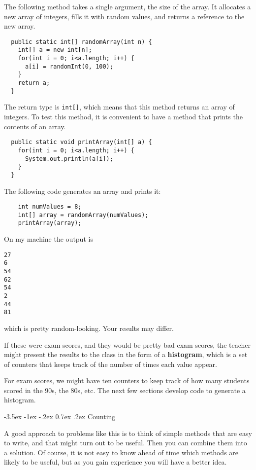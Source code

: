 \documentclass{book}
\makeatletter
\renewcommand{\section}{\@startsection 
    {section} {1} {0mm}%
    {-3.5ex \@plus -1ex \@minus -.2ex}%
    {0.7ex \@plus.2ex}%
    {\normalfont\Large\bfseries}}
\makeatother
\begin{document}
The following method takes a single argument, the size of
the array.  It allocates a new array of integers, fills
it with random values, and returns a reference to the new
array.

\begin{verbatim}
  public static int[] randomArray(int n) {
    int[] a = new int[n];
    for(int i = 0; i<a.length; i++) {
      a[i] = randomInt(0, 100);
    }
    return a;
  }
\end{verbatim}
%
The return type is {\tt int[]}, which means that
this method returns an array of integers.
To test this method, it is convenient to have a method that
prints the contents of an array.

\begin{verbatim}
  public static void printArray(int[] a) {
    for(int i = 0; i<a.length; i++) {
      System.out.println(a[i]);
    }
  }
\end{verbatim}
%
The following code generates an array and prints it:

\begin{verbatim}
    int numValues = 8;
    int[] array = randomArray(numValues);
    printArray(array);
\end{verbatim}
%
On my machine the output is

\begin{verbatim}
27
6
54
62
54
2
44
81
\end{verbatim}
%
which is pretty random-looking.  Your results may differ.

If these were exam scores, and they would be pretty bad exam
scores, the teacher might present the results to the class
in the form of a {\bf histogram}, which is a set of counters
that keeps track of the number of times each value appear.


For exam scores, we might have ten counters to keep track of
how many students scored in the 90s, the 80s, etc.  The next
few sections develop code to generate a histogram.


\section{Counting}

A good approach to problems like this is to think of simple methods
that are easy to write, and that might turn out to be useful.  Then
you can combine them into a solution.  Of course, it is not easy to
know ahead of time which methods are likely to be useful, but as you
gain experience you will have a better idea.
\end{document}
